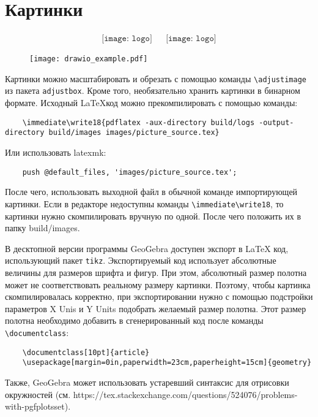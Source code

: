 \section{Картинки}

\begin{align*}
    \texttt{[image: logo]}
     &  &
    \texttt{[image: logo]}
\end{align*}
\begin{figure}[h]
    \texttt{[image: drawio\_example.pdf]}
\end{figure}
\begin{center}
\end{center}
Картинки можно масштабировать и обрезать с помощью команды \verb|\adjustimage| из пакета \verb|adjustbox|.
Кроме того, необязательно хранить картинки в бинарном формате.
Исходный \LaTeX\:код можно прекомпилировать с помощью команды:
\begin{verbatim}
    \immediate\write18{pdflatex -aux-directory build/logs -output-directory build/images images/picture_source.tex}
\end{verbatim}
Или использовать latexmk:
\begin{verbatim}
    push @default_files, 'images/picture_source.tex';
\end{verbatim}

После чего, использовать выходной файл в обычной команде импортирующей картинки.
Если в редакторе недоступны команды \verb|\immediate\write18|, то картинки нужно скомпилировать вручную по одной.
После чего положить их в папку build/images.

В десктопной версии программы GeoGebra доступен экспорт в \LaTeX\: код, использующий пакет \verb|tikz|.
Экспортируемый код использует абсолютные величины для размеров шрифта и фигур.
При этом, абсолютный размер полотна может не соответствовать реальному размеру картинки.
Поэтому, чтобы картинка скомпилировалась корректно, при экспортировании нужно с помощью подстройки параметров X Unis и Y Units подобрать желаемый размер полотна.
Этот размер полотна необходимо добавить в сгенерированный код после команды \verb|\documentclass|:
\begin{verbatim}
    \documentclass[10pt]{article}
    \usepackage[margin=0in,paperwidth=23cm,paperheight=15cm]{geometry}
\end{verbatim}
Также, GeoGebra может использовать устаревший синтаксис для отрисовки окружностей
(см. https://tex.stackexchange.com/questions/524076/problems-with-pgfplotsset).

